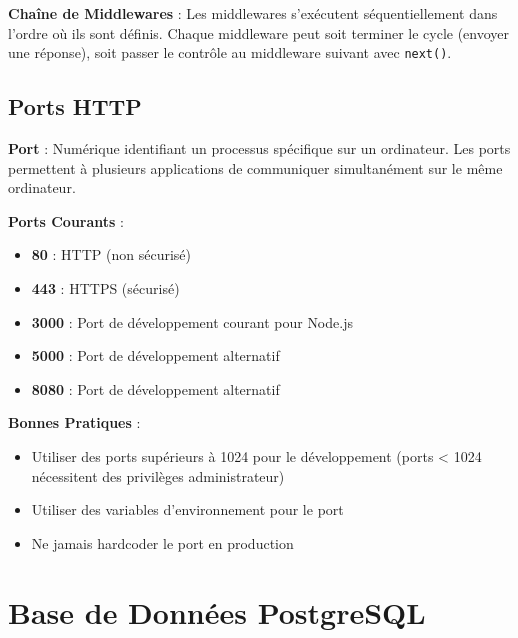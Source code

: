 \begin{architecturebox}
    \textbf{Chaîne de Middlewares} : Les middlewares s'exécutent séquentiellement dans l'ordre où ils sont définis. Chaque middleware peut soit terminer le cycle (envoyer une réponse), soit passer le contrôle au middleware suivant avec \texttt{next()}.
\end{architecturebox}

\section{Ports HTTP}

\begin{definitionbox}
    \textbf{Port} : Numérique identifiant un processus spécifique sur un ordinateur. Les ports permettent à plusieurs applications de communiquer simultanément sur le même ordinateur.
\end{definitionbox}

\textbf{Ports Courants} :
\begin{itemize}
    \item \textbf{80} : HTTP (non sécurisé)
    \item \textbf{443} : HTTPS (sécurisé)
    \item \textbf{3000} : Port de développement courant pour Node.js
    \item \textbf{5000} : Port de développement alternatif
    \item \textbf{8080} : Port de développement alternatif
\end{itemize}

\begin{bestpracticebox}
    \textbf{Bonnes Pratiques} :
    \begin{itemize}
        \item Utiliser des ports supérieurs à 1024 pour le développement (ports < 1024 nécessitent des privilèges administrateur)
        \item Utiliser des variables d'environnement pour le port
        \item Ne jamais hardcoder le port en production
    \end{itemize}
\end{bestpracticebox}

\chapter{Base de Données PostgreSQL}

